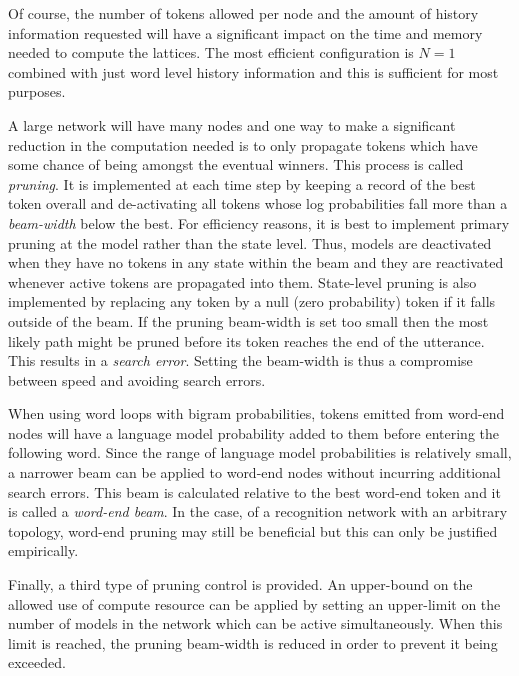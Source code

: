 Of course, the number of tokens allowed per node and the amount of
history information requested will have a significant impact on
the time and memory needed to compute the lattices.  The most
efficient configuration is $N=1$ combined with just 
word level history information and this is sufficient
for most purposes.

A large network will have many nodes and one way to make a significant
reduction in the computation needed is to only propagate tokens which
have some chance of being amongst the eventual winners.  This process
is called \textit{pruning}.  It is implemented at each time step by
keeping a record of the best token overall and de-activating all
tokens whose log probabilities fall more than a \textit{beam-width}
below the best.  For efficiency reasons, it is best to implement primary
pruning at the model rather than the state level.  Thus, models
are deactivated when they have no tokens in any state within the beam and
they are reactivated whenever active tokens are propagated into them.
State-level pruning is also implemented by replacing any token by a 
null (zero probability) token if it falls outside of the beam.
If the pruning beam-width is set too small then the most likely
path might be pruned before its token reaches the end of the utterance.
This results in a \textit{search error}.  Setting the beam-width is
thus a compromise between speed and avoiding search errors.

When using word loops with bigram probabilities, tokens emitted from
word-end nodes will have a language model probability added to them
before entering the following word.  Since the range of language
model probabilities is relatively small, a narrower beam can be
applied to word-end nodes without incurring additional 
search errors.
This beam is calculated relative to the best word-end token and
it is called a \textit{word-end beam}.  In the case, of a recognition
network with an arbitrary topology, word-end pruning may still be
beneficial but this can only be justified empirically.

Finally, a third type of pruning control is provided.  An upper-bound
on the allowed use of compute resource can be applied by setting
an upper-limit on the number of models in the network which can
be active simultaneously.  When this limit is reached, the pruning
beam-width is reduced in order to prevent it being exceeded.



